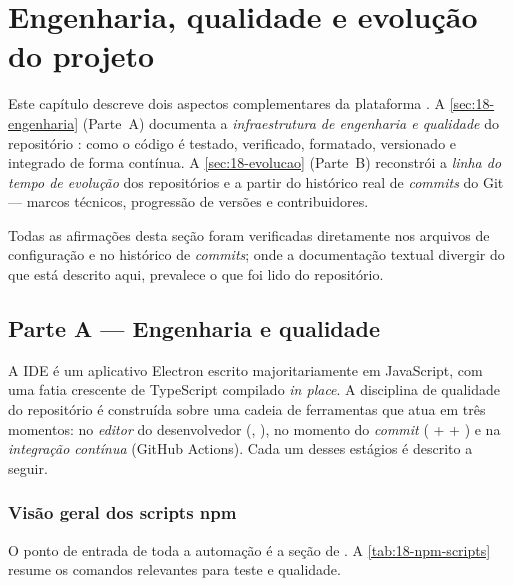 \chapter{Engenharia, qualidade e evolução do projeto}
\label{cap:18-engenharia-evolucao}

Este capítulo descreve dois aspectos complementares da plataforma .
A \autoref{sec:18-engenharia} (Parte~A) documenta a \emph{infraestrutura de
engenharia e qualidade} do repositório : como o código é testado,
verificado, formatado, versionado e integrado de forma contínua. A
\autoref{sec:18-evolucao} (Parte~B) reconstrói a \emph{linha do tempo de
evolução} dos repositórios  e  a partir do histórico
real de \emph{commits} do Git --- marcos técnicos, progressão de versões e
contribuidores.

Todas as afirmações desta seção foram verificadas diretamente nos arquivos de
configuração e no histórico de \emph{commits}; onde a documentação textual
divergir do que está descrito aqui, prevalece o que foi lido do repositório.

\section{Parte A --- Engenharia e qualidade}
\label{sec:18-engenharia}

A IDE  é um aplicativo Electron escrito majoritariamente em
JavaScript, com uma fatia crescente de TypeScript compilado \emph{in place}. A
disciplina de qualidade do repositório é construída sobre uma cadeia de
ferramentas que atua em três momentos: no \emph{editor} do desenvolvedor
(, ), no momento do \emph{commit}
( +  + ) e na
\emph{integração contínua} (GitHub Actions). Cada um desses estágios é
descrito a seguir.

\subsection{Visão geral dos scripts npm}
\label{sub:18-scripts-npm}

O ponto de entrada de toda a automação é a seção  de
. A \autoref{tab:18-npm-scripts} resume os comandos
relevantes para teste e qualidade.


